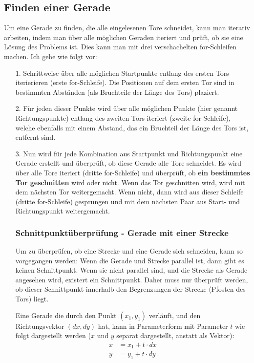 \documentclass[a4paper,10pt,ngerman]{scrartcl}
\begin{document}
\subsection{Finden einer Gerade}
Um eine Gerade zu finden, die alle eingelesenen Tore schneidet, kann man iterativ arbeiten, indem man über alle möglichen Geraden iteriert und prüft, ob sie eine Lösung des Problems ist. Dies kann man mit drei verschachelten for-Schleifen machen.
Ich gehe wie folgt vor:
\begin{itemize}
  \item [1.] Schrittweise über alle möglichen Startpunkte entlang des ersten Tors iterierieren (erste for-Schleife). Die Positionen auf dem ersten Tor sind in bestimmten Abständen (als Bruchteile der Länge des Tors) plaziert.
  \item [2.] Für jeden dieser Punkte wird über alle möglichen Punkte (hier genannt Richtungspunkte) entlang des zweiten Tors iteriert (zweite for-Schleife), welche ebenfalls mit einem Abstand, das ein Bruchteil der Länge des Tors ist, entfernt sind.
  \item [3.] Nun wird für jede Kombination aus Startpunkt und Richtungspunkt eine Gerade erstellt und überprüft, ob diese Gerade alle Tore schneidet. Es wird über alle Tore iteriert (dritte for-Schleife) und überprüft, ob \textbf{ein bestimmtes Tor geschnitten} wird oder nicht.
  Wenn das Tor geschnitten wird, wird mit dem nächsten Tor weitergemacht. Wenn nicht, dann wird aus dieser Schleife (dritte for-Schleife) gesprungen und mit dem nächsten Paar aus Start- und Richtungspunkt weitergemacht.
  \newline
  \subsubsection{Schnittpunktüberprüfung - Gerade mit einer Strecke}

  Um zu überprüfen, ob eine Strecke und eine Gerade sich schneiden, kann so vorgegangen werden: Wenn die Gerade und Strecke parallel ist, dann gibt es keinen Schnittpunkt. Wenn sie nicht parallel sind, und die Strecke als Gerade angesehen wird, existert ein Schnittpunkt.
  Daher muss nur überprüft werden, ob dieser Schnittpunkt innerhalb den Begrenzungen der Strecke (Pfosten des Tors) liegt.
  \newline 

  Eine Gerade die durch den Punkt $(x_{1}, y_{1})$ verläuft, und den Richtungsvektor $(dx, dy)$ hat, kann in Parameterform mit Parameter $t$ wie folgt dargestellt werden ($x$ und $y$ separat dargestellt, anstatt als Vektor):
  \begin{align}
    x&=x_{1} + t \cdot dx \\
    y&=y_{1} + t \cdot dy
  \end{align}
    

\end{itemize}
\end{document}
